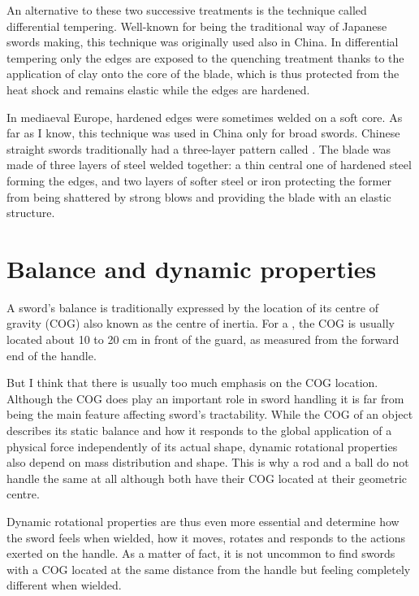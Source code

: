 An alternative to these two successive treatments is the technique called differential tempering. Well-known for being the traditional way of Japanese swords making, this technique was originally used also in China.
In differential tempering only the edges are exposed to the quenching treatment thanks to the application of clay onto the core of the blade, which is thus protected from the heat shock and remains elastic while the edges are hardened.

In mediaeval Europe, hardened edges were sometimes welded on a soft core. As far as I know, this technique was used in China only for broad swords.
Chinese straight swords traditionally had a three-layer pattern called \SanMei{}. The blade was made of three layers of steel welded together: a thin central one of hardened steel forming the edges, and two layers of softer steel or iron protecting the former from being shattered by strong blows and providing the blade with an elastic structure.

\section{Balance and dynamic properties}
A sword's balance is traditionally expressed by the location of its centre of gravity (COG) also known as the centre of inertia. For a \Jian{}, the COG is usually located about 10 to 20 cm in front of the guard, as measured from the forward end of the handle.

But I think that there is usually too much emphasis on the COG location. Although the COG does play an important role in sword handling it is far from being the main feature affecting sword's tractability. While the COG of an object describes its static balance and how it responds to the global application of a physical force independently of its actual shape, dynamic rotational properties also depend on mass distribution and shape. This is why a rod and a ball do not handle the same at all although both have their COG located at their geometric centre.

Dynamic rotational properties are thus even more essential and determine how the sword feels when wielded, how it moves, rotates and responds to the actions exerted on the handle. As a matter of fact, it is not uncommon to find swords with a COG located at the same distance from the handle but feeling completely different when wielded. 

